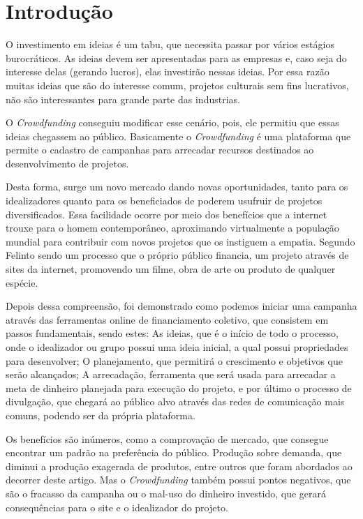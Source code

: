 \documentclass{classe_cn}                 %
\begin{document}
\section{Introdução}
O investimento em ideias é um tabu, que necessita passar por vários estágios burocráticos. As ideias devem ser apresentadas para as empresas e, caso seja do interesse delas (gerando lucros), elas investirão nessas ideias. Por essa razão muitas ideias que são do interesse comum, projetos culturais sem fins lucrativos, não são interessantes para grande parte das industrias.

O \textit{Crowdfunding} conseguiu modificar esse cenário, pois, ele permitiu que essas ideias chegassem ao público. Basicamente o \textit{Crowdfunding} é uma plataforma que permite o cadastro de campanhas para arrecadar recursos destinados ao desenvolvimento de projetos. 

Desta forma, surge um novo mercado dando novas oportunidades, tanto para os idealizadores quanto para os beneficiados de poderem usufruir de projetos diversificados. Essa facilidade ocorre por meio dos benefícios que a internet trouxe para o homem contemporâneo, aproximando virtualmente a população mundial para contribuir com novos projetos que os instiguem a empatia. Segundo Felinto \cite{FELINTO:2012} sendo um processo que o próprio público financia, um projeto através de sites da internet, promovendo um filme, obra de arte ou produto de qualquer espécie.

Depois dessa compreensão, foi demonstrado como podemos iniciar uma campanha através das ferramentas online de financiamento coletivo, que consistem em passos fundamentais, sendo estes: As ideias, que é o início de todo o processo, onde o idealizador ou grupo possui uma ideia inicial, a qual possui propriedades para desenvolver; O planejamento, que permitirá o crescimento e objetivos que serão alcançados; A arrecadação, ferramenta que será usada para arrecadar a meta de dinheiro planejada para execução do projeto, e por último o processo de divulgação, que chegará ao público alvo através das redes de comunicação mais comuns, podendo ser da própria plataforma.

Os benefícios são inúmeros, como a comprovação de mercado, que consegue encontrar um padrão na preferência do público. Produção sobre demanda, que diminui a produção exagerada de produtos, entre outros que foram abordados ao decorrer deste artigo. Mas o \textit{Crowdfunding}  também possui pontos negativos, que são o fracasso da campanha ou o mal-uso do dinheiro investido, que gerará consequências para o site e o idealizador do projeto.
\end{document}
